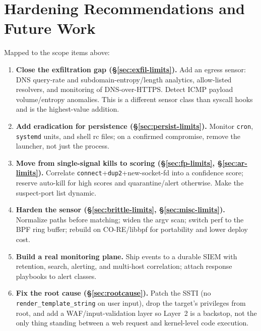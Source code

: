 \documentclass[11pt]{article}
\newcommand{\co}[1]{\texttt{#1}}
\begin{document}
\section{Hardening Recommendations and Future Work}
Mapped to the scope items above:
\begin{enumerate}[leftmargin=1.4em]
  \item \textbf{Close the exfiltration gap (\S\ref{sec:exfil-limits}).}
        Add an egress sensor: DNS query-rate and subdomain-entropy/length
        analytics, allow-listed resolvers, and monitoring of DNS-over-HTTPS.
        Detect ICMP payload volume/entropy anomalies. This is a different
        sensor class than syscall hooks and is the highest-value addition.
  \item \textbf{Add eradication for persistence (\S\ref{sec:persist-limits}).}
        Monitor \co{cron}, \co{systemd} units, and shell rc files; on a
        confirmed compromise, remove the launcher, not just the process.
  \item \textbf{Move from single-signal kills to scoring
        (\S\ref{sec:fp-limits}, \S\ref{sec:ar-limits}).} Correlate
        \co{connect}+\co{dup2}+new-socket-fd into a confidence score; reserve
        auto-kill for high scores and quarantine/alert otherwise. Make the
        suspect-port list dynamic.
  \item \textbf{Harden the sensor (\S\ref{sec:brittle-limits},
        \S\ref{sec:misc-limits}).} Normalize paths before matching; widen the
        argv scan; switch perf to the BPF ring buffer; rebuild on
        CO-RE/libbpf for portability and lower deploy cost.
  \item \textbf{Build a real monitoring plane.} Ship events to a durable
        SIEM with retention, search, alerting, and multi-host correlation;
        attach response playbooks to alert classes.
  \item \textbf{Fix the root cause (\S\ref{sec:rootcause}).} Patch the SSTI
        (no \co{render\_template\_string} on user input), drop the target's
        privileges from root, and add a WAF/input-validation layer so Layer~2
        is a backstop, not the only thing standing between a web request and
        kernel-level code execution.
\end{enumerate}

\end{document}
